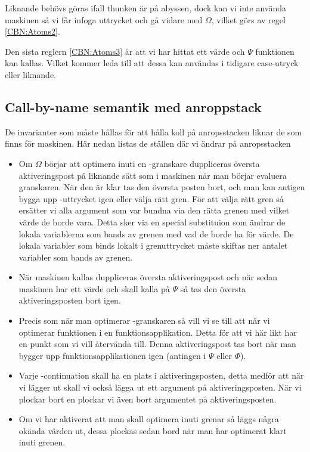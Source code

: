 \documentclass[../Optimise]{subfiles}
\begin{document}
Liknande behövs göras ifall thunken är på abyssen, dock kan vi inte använda maskinen
så vi får infoga uttrycket och gå vidare med $\Omega$, vilket görs av regel \eqref{CBN:Atoms2}. 

Den sista reglern \eqref{CBN:Atoms3} är att vi har hittat ett värde och $\Psi$ funktionen kan kallas.
Vilket kommer leda till att dessa kan användas i tidigare case-utryck eller liknande.


\subsection{Call-by-name semantik med anroppstack}


De invarianter som måste hållas för att hålla koll på anropsstacken liknar de som finns
för maskinen. Här nedan listas de ställen där vi ändrar på anropsstacken



\begin{itemize}
\item
Om $\Omega$ börjar att optimera inuti en -granskare duppliceras översta aktiveringspost 
på liknande sätt som i maskinen när man börjar evaluera granskaren. När den är klar
tas den översta posten bort, och man kan antigen bygga upp -uttrycket igen
eller välja rätt gren. För att välja rätt gren så ersätter vi alla argument som var
bundna via den rätta grenen med vilket värde de borde vara. Detta sker via en special
substituion som ändrar de lokala variablerna som bands av grenen med vad de borde ha
för värde. De lokala variabler som binds lokalt i grenuttrycket måste skiftas ner antalet
variabler som bands av grenen.

\item
När maskinen kallas duppliceras översta aktiveringspost och när sedan maskinen har
ett värde och skall kalla på $\Psi$ så tas den översta aktiveringsposten bort igen.

\item
Precis som när man optimerar -granskaren så vill vi se till att när vi 
optimerar funktionen i en funktionsapplikation. Detta för att vi här likt 
har en punkt som vi vill återvända till. Denna aktiveringspost tas bort när man 
bygger upp funktionsapplikationen igen (antingen i $\Psi$ eller $\Phi$). 

\item
Varje -continuation skall ha en plats i aktiveringsposten, detta medför
att när vi lägger ut  skall vi också lägga ut ett argument på aktiveringsposten.
När vi plockar bort en  plockar vi även bort argumentet på aktiveringsposten.

\item
Om vi har aktiverat att man skall optimera inuti grenar så läggs några okända värden ut,
dessa plockas sedan bord när man har optimerat klart inuti grenen. 


\end{itemize}
\end{document}
